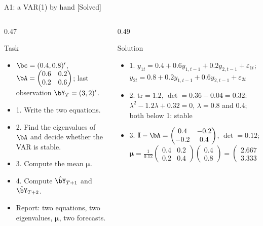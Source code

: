\begin{frame}{A1: a VAR(1) by hand [Solved]}
\itemsize{\scriptsize}
\begin{columns}[T]
\begin{column}{0.47\textwidth}
\begin{block}{Task}
\begin{itemize}
    \item $\bc = (0.4, 0.8)'$, $\bA = \begin{pmatrix} 0.6 & 0.2 \\ 0.2 & 0.6 \end{pmatrix}$; last observation $\bY_T = (3, 2)'$.
    \item 1. Write the two equations.
    \item 2. Find the eigenvalues of $\bA$ and decide whether the VAR is stable.
    \item 3. Compute the mean $\boldsymbol{\mu}$.
    \item 4. Compute $\hat\bY_{T+1}$ and $\hat\bY_{T+2}$.
    \item Report: two equations, two eigenvalues, $\boldsymbol{\mu}$, two forecasts.
\end{itemize}
\end{block}
\end{column}
\begin{column}{0.49\textwidth}
\begin{exampleblock}{Solution}
\begin{itemize}
    \item 1. $y_{1t} = 0.4 + 0.6y_{1,t-1} + 0.2y_{2,t-1} + \varepsilon_{1t}$; $y_{2t} = 0.8 + 0.2y_{1,t-1} + 0.6y_{2,t-1} + \varepsilon_{2t}$
    \item 2. $\mathrm{tr} = 1.2$, $\det = 0.36 - 0.04 = 0.32$: $\lambda^2 - 1.2\lambda + 0.32 = 0$, $\lambda = 0.8$ and $0.4$; both below 1: stable
    \item 3. $\mathbf{I} - \bA = \begin{pmatrix} 0.4 & -0.2 \\ -0.2 & 0.4 \end{pmatrix}$, $\det = 0.12$; $\boldsymbol{\mu} = \frac{1}{0.12}\begin{pmatrix} 0.4 & 0.2 \\ 0.2 & 0.4 \end{pmatrix}\begin{pmatrix} 0.4 \\ 0.8 \end{pmatrix} = \begin{pmatrix} 2.667 \\ 3.333 \end{pmatrix}$

\end{itemize}
\end{exampleblock}
\end{column}
\end{columns}
\end{frame}
